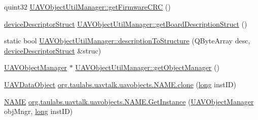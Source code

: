 \begin{DoxyCompactItemize}
quint32 \hyperlink{group___u_a_v_objects_plugin_ga2aa3a13d1eb39329f28842887c6d7db6}{U\-A\-V\-Object\-Util\-Manager\-::get\-Firmware\-C\-R\-C} ()
\item 
\hyperlink{classdevice_descriptor_struct}{device\-Descriptor\-Struct} \hyperlink{group___u_a_v_objects_plugin_ga37ed95a95ca8906a45b06bb7174b1158}{U\-A\-V\-Object\-Util\-Manager\-::get\-Board\-Description\-Struct} ()
\item 
static bool \hyperlink{group___u_a_v_objects_plugin_ga31c6b739ad7f06472a3f3386e4bebd8a}{U\-A\-V\-Object\-Util\-Manager\-::description\-To\-Structure} (Q\-Byte\-Array desc, \hyperlink{classdevice_descriptor_struct}{device\-Descriptor\-Struct} \&struc)
\item 
\hyperlink{class_u_a_v_object_manager}{U\-A\-V\-Object\-Manager} $\ast$ \hyperlink{group___u_a_v_objects_plugin_ga9a99c93b8210149fd59246e2648a9c59}{U\-A\-V\-Object\-Util\-Manager\-::get\-Object\-Manager} ()
\item 
\hyperlink{class_u_a_v_data_object}{U\-A\-V\-Data\-Object} \hyperlink{group___u_a_v_objects_plugin_ga7f66b07acd0bb68e43924835ef73a1d2}{org.\-taulabs.\-uavtalk.\-uavobjects.\-N\-A\-M\-E.\-clone} (\hyperlink{ioapi_8h_a3c7b35ad9dab18b8310343c201f7b27e}{long} inst\-I\-D)
\item 
\hyperlink{group___u_a_v_objects_plugin_gacbd8a57cc2bde1166c3cdc997e749579}{N\-A\-M\-E} \hyperlink{group___u_a_v_objects_plugin_ga23fdfcabbed3bf6b2d0a58ea85ce567b}{org.\-taulabs.\-uavtalk.\-uavobjects.\-N\-A\-M\-E.\-Get\-Instance} (\hyperlink{class_u_a_v_object_manager}{U\-A\-V\-Object\-Manager} obj\-Mngr, \hyperlink{ioapi_8h_a3c7b35ad9dab18b8310343c201f7b27e}{long} inst\-I\-D)
\end{DoxyCompactItemize}
